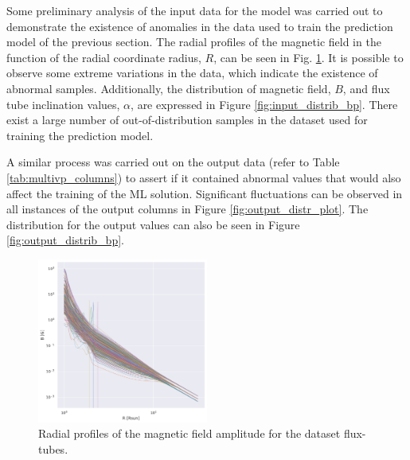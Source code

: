 Some preliminary analysis of the input data for the model was carried out to demonstrate the existence of anomalies in the data used to train the prediction model of the previous section. The radial profiles of the magnetic field in the function of the radial coordinate radius, $R$, can be seen in Fig. \ref{fig:magnetic_radius_outliers}. It is possible to observe some extreme variations in the data, which indicate the existence of abnormal samples. Additionally, the distribution of magnetic field, $B$, and flux tube inclination values, $\alpha$, are expressed in Figure \ref{fig:input_distrib_bp}. There exist a large number of out-of-distribution samples in the dataset used for training the prediction model.

A similar process was carried out on the output data (refer to Table \ref{tab:multivp_columns}) to assert if it contained abnormal values that would also affect the training of the ML solution. Significant fluctuations can be observed in all instances of the output columns in Figure \ref{fig:output_distr_plot}. The distribution for the output values can also be seen in Figure \ref{fig:output_distrib_bp}.

\begin{figure}[ht]
\centering
\includegraphics[width=0.5\textwidth]{figures/magnetic_radius_outliers.png}
\caption{Radial profiles of the magnetic field amplitude for the dataset flux-tubes.}
\label{fig:magnetic_radius_outliers}
\end{figure}

